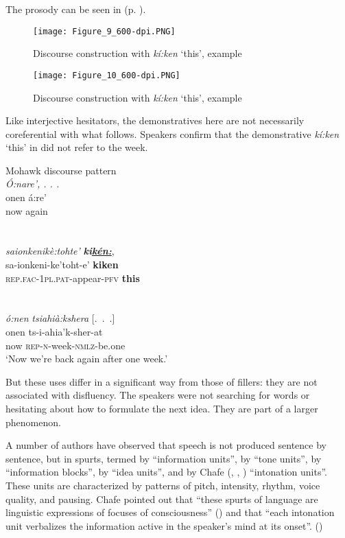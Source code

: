 \documentclass[output=paper]{langscibook}
\begin{document}
The prosody can be seen in  (p. \pageref{fig:mithun:10}).

\begin{figure}[p]
\texttt{[image: Figure\_9\_600-dpi.PNG]}
\caption{Discourse construction with \textit{kí:ken} ‘this’, example }
\label{fig:mithun:9}
\end{figure}

\begin{figure}[p]
\texttt{[image: Figure\_10\_600-dpi.PNG]}
\caption{Discourse construction with \textit{kí:ken} ‘this’, example }
\label{fig:mithun:10}
\end{figure}

Like  interjective hesitators, the demonstratives here are not necessarily coreferential with what follows. Speakers confirm that the demonstrative \textit{kí:ken} ‘this’ in  did not refer to the week.

\ea%
    \label{ex:mithun:19}
    Mohawk discourse pattern\\
 \glll \textit{Ó:nare’,  . . .}\\
    onen  á:re’\\
    now   again\\~\\~\\
\glll \textit{saionkenikè:tohte’} \textbf{\textit{ki\uline{kén:}}},\\
    sa-ionkeni-ke’toht-e’        \textbf{kiken}\\
    \textsc{rep.fac-1pl.pat}{}-appear-\textsc{pfv}  \textbf{this}\\~\\~\\
    \glll \textit{ó:nen}  \textit{tsiahià:kshera}      \textup{{[}.~.~.{]}}\\
    onen  ts-i-ahia’k-sher-at\\
    now  \textsc{rep-n-}week-\textsc{nmlz-}be.one  \\
    \glt ‘Now we’re back again after one week.’\\    
\z

But these uses differ in a significant way from those of fillers: they are not associated with disfluency. The speakers were not searching for words or hesitating about how to formulate the next idea. They are part of a larger phenomenon.

A number of authors have observed that speech is not produced sentence by sentence, but in spurts, termed by \citet{Halliday1967} “information units”, by \citet{Crystal1975} “tone units”, by \citet{Grimes1975} “information blocks”, by \citet{Kroll1977} “idea units”, and by Chafe (\citeyear{Chafe1980}, \citeyear{Chafe1994}, \citeyear{Chafe2018}) “intonation units”. These units are characterized by patterns of pitch, intensity, rhythm, voice quality, and pausing. Chafe pointed out that “these spurts of language are linguistic expressions of focuses of consciousness” (\citeyear[15]{Chafe1980}) and that “each intonation unit verbalizes the information active in the speaker’s mind at its onset”. (\citeyear[63]{Chafe1994}) 
\end{document}
